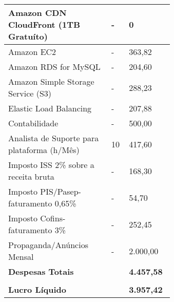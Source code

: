 \begin{enumerate}
\begin{quadro}[H]
\begin{tabular}{|p{0.50\linewidth} | p{0.04\linewidth} |  p{0.10\linewidth} |}
    Amazon CDN CloudFront (1TB Gratuíto) & - & 0 \\ \hline 
    Amazon EC2 & - & 363,82\\ \hline
    Amazon RDS for MySQL & - & 204,60 \\ \hline
    Amazon Simple Storage Service (S3) & - & 288,23 \\ \hline
    Elastic Load Balancing & - & 207,88 \\ \hline
    Contabilidade & - & 500,00 \\ \hline
    Analista de Suporte para plataforma (h/Mês) & 10 & 417,60  \\ \hline
    Imposto ISS 2\% sobre a receita bruta & - & 168,30  \\ \hline
    Imposto PIS/Pasep-faturamento 0,65\% & - & 54,70  \\ \hline
    Imposto Cofins-faturamento 3\% & - & 252,45  \\ \hline
    Propaganda/Anúncios Mensal    & - &  2.000,00  \\ \hline
    
    
    {\textbf{Despesas Totais}}   &   &   {\textbf{4.457,58}}           \\  \hline 


        & &   \\  \hline   
    {\textbf{Lucro Líquido}}   &   &   {\textbf{3.957,42}}           \\  \hline 

        \end{tabular}
    \end{quadro}
\end{enumerate}

